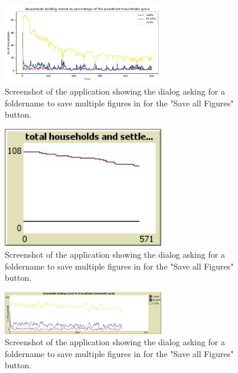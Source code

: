 \documentclass[12pt]{article}
\begin{document}
	\begin{figure}[!htb]
		\includegraphics[width=7cm]{Default_values_run_1_B}
		\caption{Screenshot of the application showing the dialog asking for a foldername to save multiple figures in for the "Save all Figures" button.}
		\label{fig:Default_values_run_1_B}
	\end{figure}

	\begin{figure}[!htb]
		\includegraphics[width=7cm]{Default_values_run_1_C}
		\caption{Screenshot of the application showing the dialog asking for a foldername to save multiple figures in for the "Save all Figures" button.}
		\label{fig:Default_values_run_1_C}
	\end{figure}

	\begin{figure}[!htb]
		\includegraphics[width=7cm]{Default_values_run_1_D}
		\caption{Screenshot of the application showing the dialog asking for a foldername to save multiple figures in for the "Save all Figures" button.}
		\label{fig:Default_values_run_1_D}
	\end{figure}

	
\end{document}
